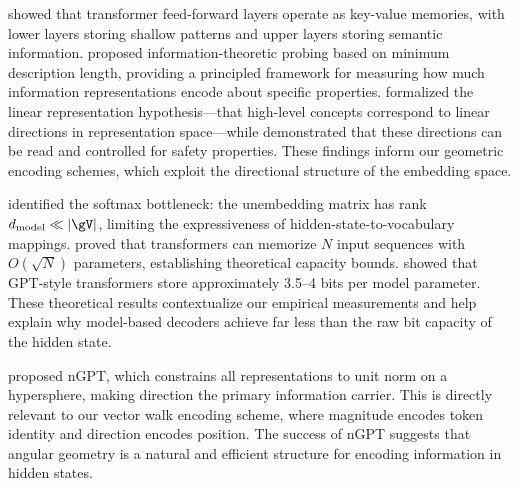 \citet{geva2021transformer} showed that transformer feed-forward layers operate as key-value memories, with lower layers storing shallow patterns and upper layers storing semantic information. \citet{voita2020information} proposed information-theoretic probing based on minimum description length, providing a principled framework for measuring how much information representations encode about specific properties. \citet{park2023linear} formalized the linear representation hypothesis---that high-level concepts correspond to linear directions in representation space---while \citet{zou2023representation} demonstrated that these directions can be read and controlled for safety properties. These findings inform our geometric encoding schemes, which exploit the directional structure of the embedding space.

\citet{yang2018breaking} identified the softmax bottleneck: the unembedding matrix has rank $\dmodel \ll \vocabsize$, limiting the expressiveness of hidden-state-to-vocabulary mappings. \citet{kajitsuka2024optimal} proved that transformers can memorize $N$ input sequences with $O(\sqrt{N})$ parameters, establishing theoretical capacity bounds. \citet{morris2025memorize} showed that GPT-style transformers store approximately 3.5--4 bits per model parameter. These theoretical results contextualize our empirical measurements and help explain why model-based decoders achieve far less than the raw bit capacity of the hidden state.

\citet{loshchilov2024ngpt} proposed nGPT, which constrains all representations to unit norm on a hypersphere, making direction the primary information carrier. This is directly relevant to our vector walk encoding scheme, where magnitude encodes token identity and direction encodes position. The success of nGPT suggests that angular geometry is a natural and efficient structure for encoding information in hidden states.
